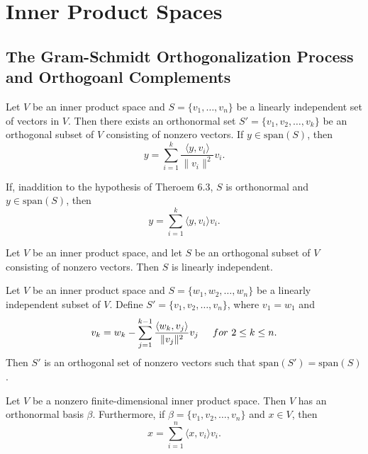 \section{Inner Product Spaces}
\setcounter{subsection}{1}
\setcounter{theorem}{2}
\subsection{The Gram-Schmidt Orthogonalization Process and Orthogoanl Complements}
\begin{theorem}
Let \(V\) be an inner product space and \(S = \{v_1, \ldots, v_n\}\) be a linearly independent set of vectors in \(V\). Then there exists an orthonormal set \(S' = \{v_1, v_2, \ldots, v_k\}\) be an orthogonal subset of \(V\) consisting of nonzero vectors. If \(y \in \text{span}(S)\), then
\[
y = \sum_{i=1}^{k} \frac{\langle y, v_i \rangle}{\lVert v_i \rVert ^2}v_i.
\]
\end{theorem}
\vspace{3cm}
\begin{corollary}
    If, inaddition to the hypothesis of Theroem 6.3, \(S\) is orthonormal and \(y \in \text{span}(S)\), then
    \[
    y = \sum_{i=1}^{k} \langle y, v_i \rangle v_i.
    \]
\end{corollary}
\begin{corollary}
    Let \(V\) be an inner product space, and let \(S\) be an orthogonal subset of \(V\) consisting of nonzero vectors. Then \(S\) is linearly independent.
\end{corollary}
\vspace{2cm}
\begin{theorem}
    Let \(V\) be an inner product space and \(S = \{w_1,w_2, \dots, w_n\}\) be a linearly independent subset of \(V\). Define \(S' = \{v_1,v_2, \dots ,v_n\}\), where \(v_1=w_1\) and
    \[
    v_k = w_k - \sum_{j=1}^{k-1} \frac{\langle w_k, v_j \rangle}{\lVert v_j \rVert ^2}v_j\hspace{5mm} for\ 2 \leq k \leq n.
    \]
    Then \( S'\) is an orthogonal set of nonzero vectors such that \(\text{span}(S') = \text{span}(S)\).
\end{theorem}
\vspace{7cm}
\begin{theorem}
    Let \(V\) be a nonzero finite-dimensional inner product space. Then \(V\) has an orthonormal basis $\beta$. Furthermore, if \(\beta = \{ v_1, v_2, \dots , v_n\}\) and \(x \in V \), then
    \[
    x = \sum_{i=1}^{n} \langle x, v_i \rangle v_i.
    \]
\end{theorem}
